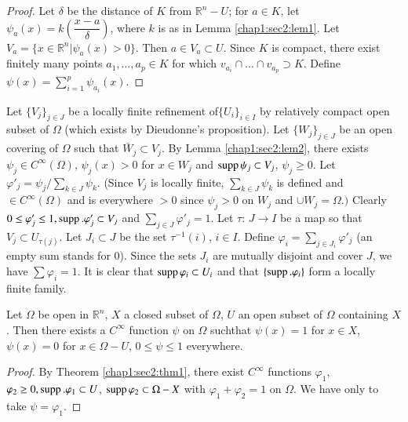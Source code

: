 \begin{proof}
  Let $\delta$ be the distance of $K$ from $\mathbb{R}^n - U$; for $a
  \in K$, let $\psi_a (x) = k\left(\dfrac{x-a}{\delta}\right)$, where
  $k$ is as 
  in Lemma \ref{chap1:sec2:lem1}. Let $V_a = \{ x \in \mathbb{R}^n | \psi_a (x) > 0
  \}$. Then $a \in V_a \subset U$. Since $K$ is compact, there exist
  finitely many points $a_1, \ldots, a_p \in K$ for which $v_{a_i} \cap
  \ldots \cap v_{a_p} \supset K$. Define $\psi (x) = \sum \limits^p_{i
    = 1} \psi_{a_{i}} (x)$. 
\end{proof}

\begin{proof of theorem}\label{chap1:sec2:pot1}%
  Let $\{ V_j \}_{j \in J}$ be a locally finite refinement of$\{ U_i
  \}_{i \in I}$ by relatively compact open subset of $\Omega$ (which
  exists by Dieudonne's proposition). Let $\{ W_j \}_{j \in J}$ be an
  open covering of $\Omega$ such that $\bar{W}_j \subset V_j$. By
  Lemma \ref{chap1:sec2:lem2}, there exists $\psi_j \in C^{\infty}
  (\Omega)$, $\psi_j 
  (x) > 0$ for $x \in W_j$ and $\operatorname{supp} \psi_j \subset V_j$, $\psi_j \geq
  0$. Let $\varphi'_j = \psi_j / \sum \limits_{k \in J}
  \psi_k$. (Since $V_j$ is locally finite, $\sum \limits_{k \in J}
  \psi _k$ is defined and $\in C^{\infty} (\Omega )$ and is everywhere
  $> 0$ since $\psi_j > 0$ on $W_j$ and $\cup W_j = \Omega.)$ Clearly
  $0 \leq \varphi'_j \leq 1, \operatorname{supp}. \varphi'_j \subset V_j$ and $\sum
  \limits_{j \in J} \varphi'_j = 1$. Let $\tau$: $J \to I$ be a map so
  that $V_j \subset U_{\tau (j)}$. Let $J_i \subset J$ be the set
  $\tau^{-1} (i)$, $i \in I$. Define $\varphi_i = \sum \limits_{j \in
    J_i} \varphi'_j$ (an empty sum stands for $0$). Since the sets $J_i$
  are mutually disjoint and cover $J$, we have $\sum \varphi_i =1$. It
  is clear that $\operatorname{supp} \varphi_i \subset U_i$ and that $\{
  \operatorname{supp}. \varphi_i \}$ form a locally finite family. 
\end{proof of theorem}

\begin{coro*}
  Let $\Omega$ be open in $\mathbb{R}^n$, $X$ a closed subset of
  $\Omega$, $U$ an open subset of $\Omega$ containing $X$. Then there
  exists a $C^{\infty}$ function $\psi$ on $\Omega$ such\pageoriginale that $\psi
  (x) = 1$ for $x \in X$, $\psi (x) = 0$ for $x \in \Omega -U$, $0
  \leq \psi \leq 1$ everywhere. 
\end{coro*}

\begin{proof}
  By Theorem \ref{chap1:sec2:thm1}, there exist $C^{\infty}$ functions $\varphi_1$,
  $\varphi_2 \geq 0, \operatorname{supp}. \varphi_1 \subset U$, $\operatorname{supp} \varphi_2
  \subset \Omega - X$ with $\varphi_1 + \varphi_2 = 1$ on $\Omega$. We
  have only to take $\psi = \varphi_1$. 
\end{proof}

